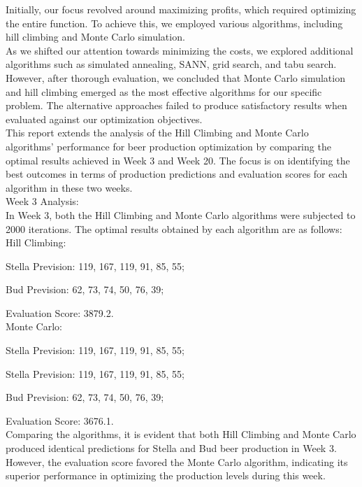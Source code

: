 Initially, our focus revolved around maximizing profits, which required optimizing the entire function. To achieve this, we employed various algorithms, including hill climbing and Monte Carlo simulation.\\


As we shifted our attention towards minimizing the costs, we explored additional algorithms such as simulated annealing, SANN, grid search, and tabu search. However, after thorough evaluation, we concluded that Monte Carlo simulation and hill climbing emerged as the most effective algorithms for our specific problem. The alternative approaches failed to produce satisfactory results when evaluated against our optimization objectives.\\



This report extends the analysis of the Hill Climbing and Monte Carlo algorithms' performance for beer production optimization by comparing the optimal results achieved in Week 3 and Week 20. The focus is on identifying the best outcomes in terms of production predictions and evaluation scores for each algorithm in these two weeks.\\

Week 3 Analysis:\\

In Week 3, both the Hill Climbing and Monte Carlo algorithms were subjected to 2000 iterations. The optimal results obtained by each algorithm are as follows:\\

\quad Hill Climbing:

\quad \quad \textbullet Stella Prevision: 119, 167, 119, 91, 85, 55;

\quad \quad \textbullet Bud Prevision: 62, 73, 74, 50, 76, 39;

\quad \quad \textbullet Evaluation Score: 3879.2.\\

\quad Monte Carlo:

\quad \quad \textbullet Stella Prevision: 119, 167, 119, 91, 85, 55;

\quad \quad \textbullet Stella Prevision: 119, 167, 119, 91, 85, 55;

\quad \quad \textbullet Bud Prevision: 62, 73, 74, 50, 76, 39;

\quad \quad \textbullet Evaluation Score: 3676.1.\\

Comparing the algorithms, it is evident that both Hill Climbing and Monte Carlo produced identical predictions for Stella and Bud beer production in Week 3. However, the evaluation score favored the Monte Carlo algorithm, indicating its superior performance in optimizing the production levels during this week.\\



